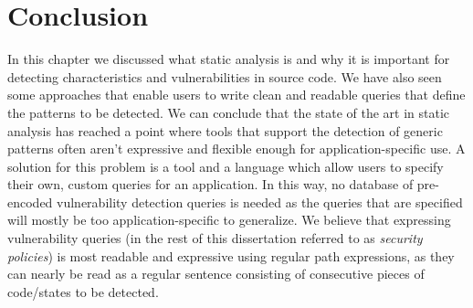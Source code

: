 




\section{Conclusion}
In this chapter we discussed what static analysis is and why it is important for detecting characteristics and vulnerabilities in source code. We have also seen some approaches that enable users to write clean and readable queries that define the patterns to be detected. We can conclude that the state of the art in static analysis has reached a point where tools that support the detection of generic patterns often aren't expressive and flexible enough for application-specific use. A solution for this problem is a tool and a language which allow users to specify their own, custom queries for an application. In this way, no database of pre-encoded vulnerability detection queries is needed as the queries that are specified will mostly be too application-specific to generalize. We believe that expressing vulnerability queries (in the rest of this dissertation referred to as \textit{security policies}) is most readable and expressive using regular path expressions, as they can nearly be read as a regular sentence consisting of consecutive pieces of code/states to be detected.